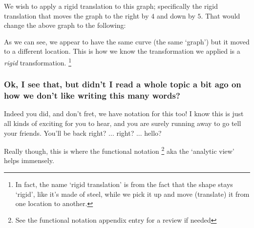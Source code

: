 \documentclass{ximeraXloud}
\begin{document}
    We wish to apply a rigid translation to this graph; specifically the rigid translation that moves the graph to the right by $4$ and down by $5$. That would change the above graph to the following:
    
    \begin{minipage}{\textwidth}
        \begin{center}
        \end{center}
    \end{minipage}
    
    As we can see, we appear to have the same curve (the same `graph') but it moved to a different location. This is how we know the transformation we applied is a \textit{rigid} transformation.%
    \footnote{%
        In fact, the name `rigid translation' is from the fact that the shape stays `rigid', like it's made of steel, while we pick it up and move (translate) it from one location to another.%
        }

    \subsubsection*{Ok, I see that, but didn't I read a whole topic a bit ago on how we don't like writing this many words?}
        Indeed you did, and don't fret, we have notation for this too! I know this is just all kinds of exciting for you to hear, and you are surely running away to go tell your friends. You'll be back right? ... right? ... hello?
        
        Really though, this is where the functional notation%
        \footnote{%
            See the functional notation appendix entry for a review if needed%
            }
        aka the `analytic view' helps immensely.
\end{document}
